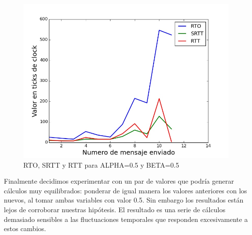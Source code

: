 \begin{figure}[H]
  \begin{center}
      \includegraphics[scale=0.32]{imagenes/ALPHA_050_BETA_050.jpg}
      \caption{RTO, SRTT y RTT para ALPHA=0.5 y BETA=0.5}
  \end{center}
\end{figure}

Finalmente decidimos experimentar con un par de valores que podría generar cálculos muy equilibrados:
ponderar de igual manera los valores anteriores con los nuevos, al tomar ambas variables con valor
0.5. Sin embargo los resultados están lejos de corroborar nuestras hipótesis.
El resultado es una serie de cálculos demasiado sensibles a las fluctuaciones temporales que responden
excesivamente a estos cambios.






